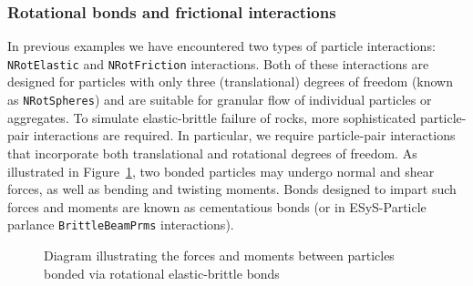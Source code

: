 \subsubsection{Rotational bonds and frictional interactions}

In previous examples we have encountered two types of particle interactions: \texttt{NRotElastic} and \texttt{NRotFriction} interactions. Both of these interactions are designed for particles with only three (translational) degrees of freedom (known as \texttt{NRotSpheres}) and are suitable for granular flow of individual particles or aggregates. To simulate elastic-brittle failure of rocks, more sophisticated particle-pair interactions are required. In particular, we require particle-pair interactions that incorporate both translational and rotational degrees of freedom. As illustrated in Figure~\ref{fig:rot_bond_diagram}, two bonded particles may undergo normal and shear forces, as well as bending and twisting moments. Bonds designed to impart such forces and moments are known as cementatious bonds (or in ESyS-Particle parlance \texttt{BrittleBeamPrms} interactions). 

\begin{figure}
\begin{minipage}{3in}
\begin{center}
\end{center}
\end{minipage}
\begin{minipage}{3in}
\caption{Diagram illustrating the forces and moments between particles bonded via rotational elastic-brittle bonds} \label{fig:rot_bond_diagram}
\end{minipage}
\end{figure}


